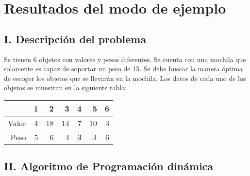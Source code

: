 \documentclass{article}
\begin{document}
\section*{Resultados del modo de ejemplo}
\subsection*{I. Descripción del problema}
Se tienen 6 objetos con valores y pesos diferentes. Se cuenta con una mochila que solamente es capaz de soportar un peso de 15. Se debe buscar la manera óptima de escoger los objetos que se llevarán en la mochila. Los datos de cada uno de los objetos se muestran en la siguiente tabla:\begin{table}[h]
\centering
\begin{tabular}{r|rrrrrr}
& 1 & 2 & 3 & 4 & 5 & 6 \\ \hline
Valor&4&18&14&7&10&3\\
Peso&5&6&4&3&4&6\\
\end{tabular}
\end{table}
\subsection*{II. Algoritmo de Programación dinámica}
\end{document}
